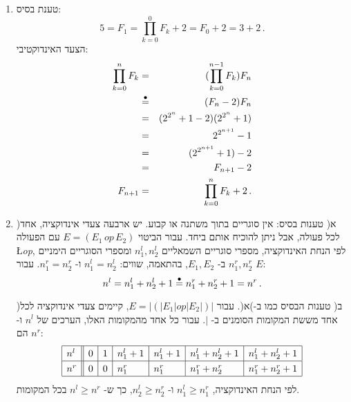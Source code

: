 \begin{enumerate}
\item
טענת בסיס:
\[
5=F_1=\prod_{k=0}^{0} F_k + 2=F_0+2=3+2\,.
\]
הצעד האינדוקטיבי:
\begin{eqnarray*}
\prod_{k=0}^{n}F_k&=&(\prod_{k=0}^{n-1}F_k) F_n \\
&\stackrel{\bullet}{=}& (F_n-2)F_n\\
&=& (2^{2^n}+1-2)(2^{2^n}+1)\\
&=& 2^{2^{n+1}}-1\\
&=& (2^{2^{n+1}}+1)-2\\
&=&F_{n+1}-2\\
F_{n+1}&=&\prod_{k=0}^{n}F_k + 2\,.
\end{eqnarray*}


\item
)א( טענות בסיס: אין סוגריים בתוך משתנה או קבוע. יש ארבעה צעדי אינדוקציה, אחד לכל פעולה, אבל ניתן להוכיח אותם ביחד. עבור הביטוי
$E=(E_1 \,\textit{op}\, E_2)$
עם הפעולה
\L{\textit{op}},
לפי הנחת האינדוקציה, מספרי סוגריים השמאליים
$n_1^l,n_2^l$
ומספרי הסוגריים הימניים
$n_1^r,n_2^r$
ב-%
$E_1,E_2$,
בהתאמה, שווים:
$n_1^l=n_2^l$
ו-%
$n_1^r=n_2^r$.
עבור
$E$:
\[
n^l=n_1^l+n_2^l+1\stackrel{\bullet}{=}{}n_1^r+n_2^r+1=n^r\,.
\]

)ב( טענות הבסיס כמו ב-)א(. עבור
$E=|(|E_1 | \textit{op} | E_2|)|$,
קיימים צעדי אינדוקציה לכל אחד מששת המקומות הסומנים ב-%
$|$.
עבור כל אחד מהמקומות האלו, הערכים של
$n^l$
ו-%
$n^r$
הם:
\[
\renewcommand{\arraystretch}{1.3}
\begin{array}{|l||l|l|l|l|l|l|}
\hline
n^l&0& 1& n_1^l+1& n_1^l+1& n_1^l+n_2^l+1& n_1^l+n_2^l+1\\\hline
n^r&0& 0& n_1^r& n_1^r& n_1^r+n_2^r& n_1^r+n_2^r+1\\\hline
\end{array}
\]
לפי הנחת האינדוקציה,
$n_1^l \geq n_1^r$
ו-
$n_2^l \geq n_2^r$,
כך ש-%
$n^l\geq n^r$
בכל המקומות.


\end{enumerate}
